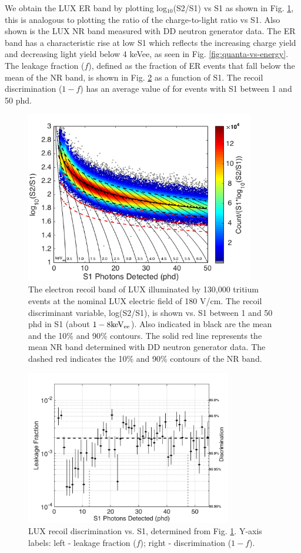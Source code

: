 We obtain the LUX ER band by plotting log$_{10}$(S2/S1) vs S1 as shown in Fig. \ref{fig:ER_band}, this is analogous to plotting the ratio of the charge-to-light ratio vs S1. Also shown is the LUX NR band measured with DD neutron generator data. The ER band has a characteristic rise at low S1 which reflects the increasing charge yield and decreasing light yield below 4 keVee, as seen in Fig. \ref{fig:quanta-vs-energy}. The leakage fraction ($f$), defined as the fraction of ER events that fall below the mean of the NR band, is shown in Fig. \ref{fig:Leak} as a function of S1. The recoil discrimination ($1-f$) has an average value of  for events with S1 between 1 and 50 phd.

\begin{figure}[h!]\centering
\includegraphics[width=100mm]{fig/CH3T_ER_Band.png}
\caption{The electron recoil band of LUX illuminated by 130,000 tritium events at the nominal LUX electric field of 180 V/cm.  The recoil discriminant variable, log(S2/S1), is shown vs. S1 between 1 and 50 phd in S1 (about $\rm1-8 keV_{ee}$). Also indicated in black are the mean and the 10\% and 90\% contours. The solid red line represents the mean NR band determined with DD neutron generator data. The dashed red indicates the 10\% and 90\% contours of the NR band.}
\label{fig:ER_band}
\end{figure}

\begin{figure}[h!]\centering
\includegraphics[width=90mm]{fig/CH3T_Leakage_Run03.png}
\caption{LUX recoil discrimination vs. S1, determined from Fig. \ref{fig:ER_band}. Y-axis labels: left -  leakage fraction ($f$); right - discrimination ($1-f$).}
\label{fig:Leak}
\end{figure}

